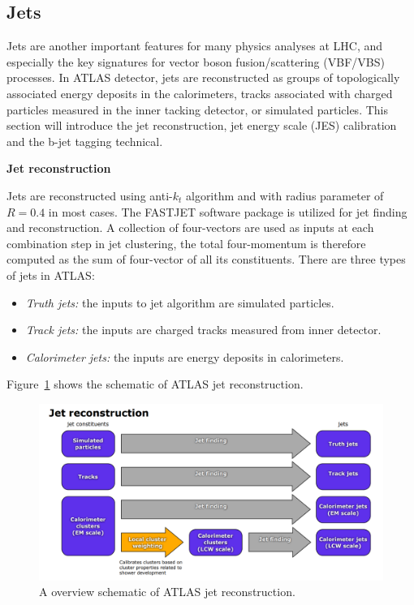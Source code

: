 \subsection{Jets}

Jets are another important features for many physics analyses at LHC, and especially the key signatures for vector boson fusion/scattering (VBF/VBS) processes.
In ATLAS detector, jets are reconstructed as groups of topologically associated energy deposits in the calorimeters, 
tracks associated with charged particles measured in the inner tacking detector, or simulated particles.
This section will introduce the jet reconstruction, jet energy scale (JES) calibration and the b-jet tagging technical.

\textbf{Jet reconstruction}

Jets are reconstructed using anti-$k_{t}$ algorithm\cite{Cacciari_2008} and with radius parameter of $R = 0.4$ in most cases.
The FASTJET software package\cite{Cacciari2012} is utilized for jet finding and reconstruction.
A collection of four-vectors are used as inputs at each combination step in jet clustering, 
the total four-momentum is therefore computed as the sum of four-vector of all its constituents.
There are three types of jets in ATLAS:
\begin{itemize}
	\item \textit{Truth jets:} the inputs to jet algorithm are simulated particles.
	\item \textit{Track jets:} the inputs are charged tracks measured from inner detector.
	\item \textit{Calorimeter jets:} the inputs are energy deposits in calorimeters.
\end{itemize}
Figure~\ref{fig:jet_reco_overview} shows the schematic of ATLAS jet reconstruction.
\begin{figure}[!htb]
  \centering
  \includegraphics[width=1.0\textwidth]{figures/Simulation/threetypes_jet_reco.png}
  \caption{A overview schematic of ATLAS jet reconstruction\cite{Aad:2014bia}.}
  \label{fig:jet_reco_overview}
\end{figure}

